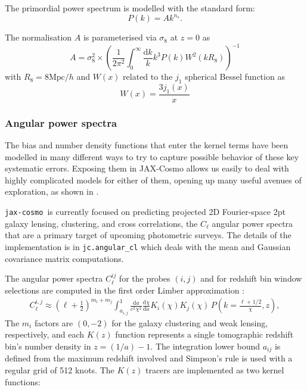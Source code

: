 \documentclass[twocolumn,twocolappendix,nofootinbib,iop]{openjournal}
\newcommand{\JZ}[1]{{\color{purple}JZ: #1}}
\newcommand{\resubnote}[1]{#1} %
\newcommand{\jaxcosmo}{\texttt{jax-cosmo}}
\newcommand{\jax}{\texttt{JAX}}
\begin{document}
The primordial power spectrum is modelled with the standard form:
\begin{equation}
    P(k) = A k^{n_s}.
\end{equation}

The normalisation $A$ is parameterised via $\sigma_8$ at $z=0$ as 
\begin{equation}
    A = \sigma_8^2 \times \left(\frac{1}{2 \pi^2} \int_0^\infty \frac{\mathrm{d}k}{k} k^3 P(k) W^2(kR_8) \right)^{-1}
\end{equation}
with $R_8 = 8 \mathrm{Mpc}/h$ and $W(x)$ related to the $j_1$ spherical Bessel function as
\begin{equation}
    W(x) = \frac{3j_1(x)}{x}
\end{equation}

%
\subsubsection{Angular power spectra}

\resubnote{The bias and number density functions that enter the kernel terms have been modelled in many different ways to try to capture possible behavior of these key systematic errors. Exposing them in JAX-Cosmo allows us easily to deal with highly complicated models for either of them, opening up many useful avenues of exploration, as shown in \citet{ruiz-zapatero}}.

%
\jaxcosmo\ is currently focused on predicting projected 2D Fourier-space 2pt galaxy lensing, clustering, and cross correlations, the $C_\ell$ angular power spectra that are a primary target of upcoming photometric surveys. The details of the implementation is in \texttt{jc.angular\_cl} which deals with the mean and Gaussian covariance matrix computations.

The angular power spectra $C_\ell^{ij}$ for the probes $(i,j)$ and for redshift bin window selections are computed in the first order Limber approximation \citep{PhysRevD.78.123506}:
\begin{align}
    C_\ell^{i,j} \approx \left(\ell+\frac{1}{2}\right)^{m_i+m_j}\int_{a_{i,j}}^1\frac{\mathrm{d}a}{c^2\chi^2}\frac{\mathrm{d}\chi}{\mathrm{d}a}K_i(\chi)K_j(\chi)\,P\left(k=\frac{\ell+1/2}{\chi},z\right),\label{eq:Cell_limber}
\end{align}
The $m_i$ factors are $(0,-2)$ for the galaxy clustering and weak lensing, respectively, and each $K(z)$ function represents a single tomographic redshift bin's number density \resubnote{in $z=(1/a)-1$. The integration lower bound $a_{ij}$ is defined from the maximum redshift involved  and  Simpson's rule is used  with a regular grid of 512 knots. The $K(z)$} tracers are implemented as two kernel functions:
\end{document}
